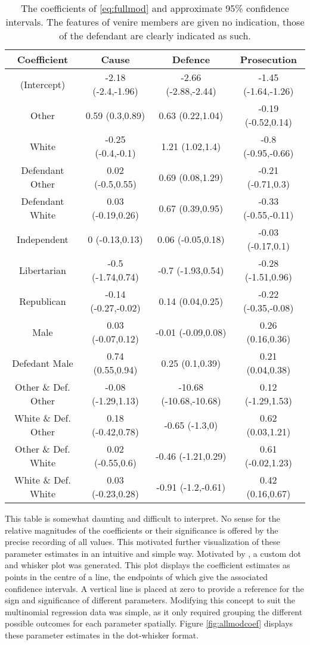 \begin{table}[h!]
  \centering
  \caption[Final Model Race Coefficients Confidence Intervals Excluding Kept]{\footnotesize The coefficients of \ref{eq:fullmod}
    and approximate 95\% confidence intervals. The features of venire members are given no indication, those of the defendant are
    clearly indicated as such.}
  \label{tab:fullmodracecoef}
  \begin{tabular}{|c|c|c|c|} \hline
    Coefficient & Cause & Defence & Prosecution \\ \hline
    (Intercept) & -2.18 (-2.4,-1.96) & -2.66 (-2.88,-2.44) & -1.45 (-1.64,-1.26)\\
    Other & 0.59 (0.3,0.89) & 0.63 (0.22,1.04) & -0.19 (-0.52,0.14)\\
    White & -0.25 (-0.4,-0.1) & 1.21 (1.02,1.4) & -0.8 (-0.95,-0.66)\\
    Defendant Other & 0.02 (-0.5,0.55) & 0.69 (0.08,1.29) & -0.21 (-0.71,0.3)\\
    Defendant White & 0.03 (-0.19,0.26) & 0.67 (0.39,0.95) & -0.33 (-0.55,-0.11)\\
    Independent & 0 (-0.13,0.13) & 0.06 (-0.05,0.18) & -0.03 (-0.17,0.1)\\
    Libertarian & -0.5 (-1.74,0.74) & -0.7 (-1.93,0.54) & -0.28 (-1.51,0.96)\\
    Republican & -0.14 (-0.27,-0.02) & 0.14 (0.04,0.25) & -0.22 (-0.35,-0.08)\\
    Male & 0.03 (-0.07,0.12) & -0.01 (-0.09,0.08) & 0.26 (0.16,0.36)\\
    Defedant Male & 0.74 (0.55,0.94) & 0.25 (0.1,0.39) & 0.21 (0.04,0.38)\\
    Other \& Def. Other & -0.08 (-1.29,1.13) & -10.68 (-10.68,-10.68) & 0.12 (-1.29,1.53)\\
    White \& Def. Other & 0.18 (-0.42,0.78) & -0.65 (-1.3,0) & 0.62 (0.03,1.21)\\
    Other \& Def. White & 0.02 (-0.55,0.6) & -0.46 (-1.21,0.29) & 0.61 (-0.02,1.23)\\
    White \& Def. White & 0.03 (-0.23,0.28) & -0.91 (-1.2,-0.61) & 0.42 (0.16,0.67) \\ \hline
  \end{tabular}
\end{table}

This table is somewhat daunting and difficult to interpret. No sense for the relative magnitudes of the coefficients or their
significance is offered by the precise recording of all values. This motivated further visualization of these parameter estimates
in an intuitive and simple way. Motivated by \cite{dotwhisker}, a custom dot and whisker plot was generated. This plot displays
the coefficient estimates as points in the centre of a line, the endpoints of which give the associated confidence intervals. A
vertical line is placed at zero to provide a reference for the sign and significance of different parameters. Modifying this
concept to suit the multinomial regression data was simple, as it only required grouping the different possible outcomes for each
parameter spatially. Figure \ref{fig:allmodcoef} displays these parameter estimates in the dot-whisker format.

